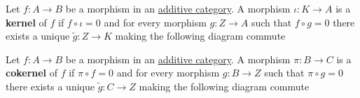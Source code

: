 \documentclass[../../../main]{subfiles}
\begin{document}
\begin{definition}[Kernel] \label{def:categorical-kernel}
  Let \(f: A \to B\) be a morphism in an \hyperref[def:additive-category]{additive category}.
  A morphism \(\iota: K \to A\) is a \textbf{kernel} of \(f\) if \(f \circ \iota = 0\) and for every morphism \(g: Z \to A\) such that \(f \circ g = 0\) there exists a unique \(\tilde{g}:Z \to K\) making the following diagram commute
  \begin{center}
  \end{center}
\end{definition}

\begin{definition}[Cokernel] \label{def:categorical-cokernel}
  Let \(f: A \to B\) be a morphism in an \hyperref[def:additive-category]{additive category}.
  A morphism \(\pi: B \to C\) is a \textbf{cokernel} of \(f\) if \(\pi \circ f = 0\) and for every morphism \(g: B \to Z\) such that \(\pi \circ g = 0\) there exists a unique \(\tilde{g}:C \to Z\) making the following diagram commute
  \begin{center}
  \end{center}
\end{definition}
\end{document}
